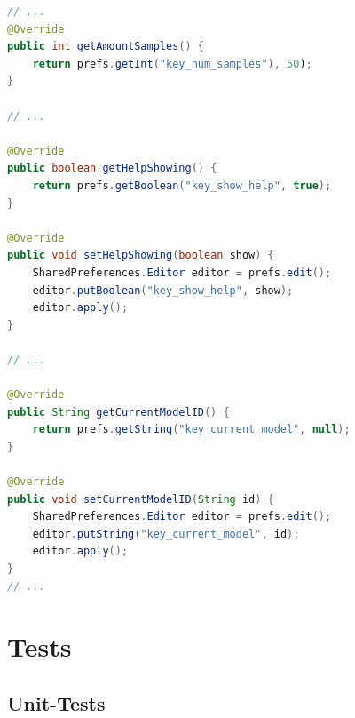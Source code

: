 \documentclass[oneside]{ausarbeitung}
\begin{document}
\begin{minipage}{\linewidth}
	\begin{lstlisting}[language=Java, breaklines=true, caption={Auschnitt aus SharedPrefsHelper}]
// ...
@Override
public int getAmountSamples() {
	return prefs.getInt("key_num_samples"), 50);
}

// ...

@Override
public boolean getHelpShowing() {
	return prefs.getBoolean("key_show_help", true);
}

@Override
public void setHelpShowing(boolean show) {
	SharedPreferences.Editor editor = prefs.edit();
	editor.putBoolean("key_show_help", show);
	editor.apply();
}

// ...

@Override
public String getCurrentModelID() {
	return prefs.getString("key_current_model", null);
}

@Override
public void setCurrentModelID(String id) {
	SharedPreferences.Editor editor = prefs.edit();
	editor.putString("key_current_model", id);
	editor.apply();
}
// ...
	\end{lstlisting}
\end{minipage}
\label{lst:shared-prefs}

\chapter{Tests}
\label{cha:tests}
\section{Unit-Tests}
\end{document}

